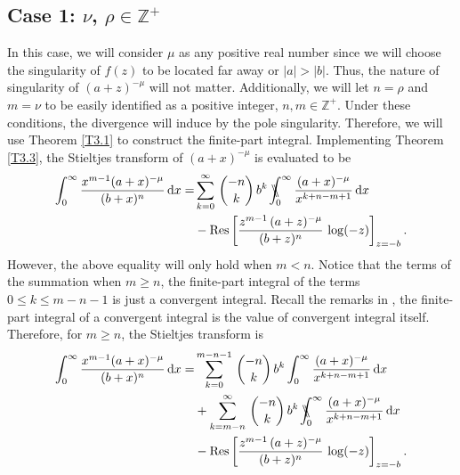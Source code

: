 \subsection{Case 1: $\nu$, $\rho \in \mathbb{Z}^{+}$}

In this case, we will consider $\mu$ as any positive real number since we will choose the singularity of $f(z)$ to be located far away or $|a| > |b|$. Thus, the nature of singularity of $(a+z)^{-\mu}$ will not matter. Additionally, we will let $n = \rho$ and $m = \nu$ to be easily identified as a positive integer, $n, m \in \mathbb{Z}^{+}$. Under these conditions, the divergence will induce by the pole singularity. Therefore, we will use Theorem \ref{T3.1} to construct the finite-part integral. Implementing Theorem \ref{T3.3}, the Stieltjes transform of $(a+x)^{-\mu}$ is evaluated to be 
\begin{equation}
\begin{split}
\int_0^{\infty} \frac{x^{m-1} (a+x)^{-\mu}}{(b+x)^{n}} \, \mathrm{d}x =& \sum_{k=0}^{\infty} \, {- n \choose k} \, b^{k} \,\bbint{0}{\infty} \frac{(a+x)^{-\mu}}{x^{k+n-m+1}} \,\mathrm{d}x \\
& - \mathrm{Res} \left[ \frac{z^{m-1} \, (a+z)^{-\mu}}{(b+z)^{n}}\, \log(-z)\right]_{z=-b}.
\end{split} \label{mlessn}
\end{equation}
However, the above equality will only hold when $m < n$. Notice that the terms of the summation when $m \geq n$, the finite-part integral of the terms $0 \leq k \leq m-n-1$ is just a convergent integral. Recall the remarks in \cite{doi:10.1063/5.0038274}, the finite-part integral of a convergent integral is the value of convergent integral itself. Therefore, for $m \geq n$, the Stieltjes transform is
\begin{equation}
\begin{split} \label{mgeqn}
\int_0^{\infty} \frac{x^{m-1} (a+x)^{-\mu}}{(b+x)^{n}} \, \mathrm{d}x =& \sum_{k=0}^{m-n-1} \, {- n \choose k} \, b^{k}   \int_0^{\infty} \frac{(a+x)^{-\mu}}{x^{k+n-m+1}} \,\mathrm{d}x \\& + \sum_{k=m-n}^{\infty} \, {- n \choose k} \, b^{k} \,\bbint{0}{\infty} \frac{(a+x)^{-\mu}}{x^{k+n-m+1}} \,\mathrm{d}x \\
& - \mathrm{Res} \left[ \frac{z^{m-1} \, (a+z)^{-\mu}}{(b+z)^{n}}\, \log(-z)\right]_{z=-b}.
\end{split}
\end{equation}

